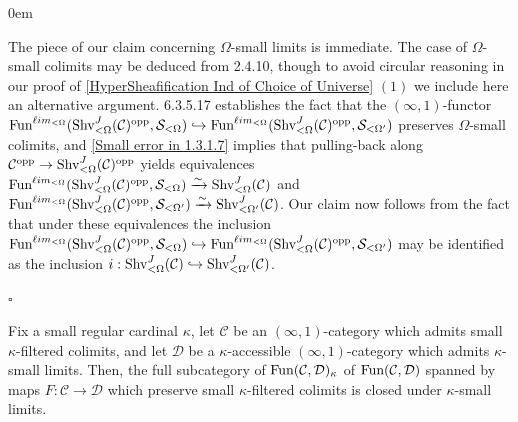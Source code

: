 \documentclass[10pt]{article}
\newcommand{\mS}{\mathcal S}
\newcommand{\C}{\mathcal C}
\newcommand{\cD}{\mathcal{D}}
\renewcommand{\qed}{\hfill$\square$}
\renewenvironment{proof}{\begin{addmargin}[1em]{0em}\begin{newproof}}{\end{newproof}\end{addmargin}\qed}
\theoremstyle{witharg}
\theoremstyle{witharg}
\theoremstyle{witharg2}
\begin{document}
\begin{proof}

    The piece of our claim concerning $\Omega$-small limits is immediate. The case of $\Omega$-small colimits may be deduced from  2.4.10, though to avoid circular reasoning in our proof of \ref{HyperSheafification Ind of Choice of Universe} $(1)$ we include here an alternative argument.  6.3.5.17 establishes the fact that the $(\infty,1)$-functor $\textnormal{Fun}^{\ell im_{<\Omega}}(\textnormal{Shv}^J_{<\Omega}(\C)^{\textnormal{opp}},\mS_{<\Omega})\hookrightarrow \textnormal{Fun}^{\ell im_{<\Omega}}(\textnormal{Shv}^J_{<\Omega}(\C)^{\textnormal{opp}},\mS_{<\Omega^\prime})$ preserves $\Omega$-small colimits, and \ref{Small error in 1.3.1.7} implies that pulling-back along $\C^{\textnormal{opp}}\rightarrow \textnormal{Shv}^J_{<\Omega}(\C)^{\textnormal{opp}}$ yields equivalences $\textnormal{Fun}^{\ell im_{<\Omega}}(\textnormal{Shv}^J_{<\Omega}(\C)^{\textnormal{opp}},\mS_{<\Omega})\xrightarrow{\sim}\textnormal{Shv}^J_{<\Omega}(\C)$ and $\textnormal{Fun}^{\ell im_{<\Omega}}(\textnormal{Shv}^J_{<\Omega}(\C)^{\textnormal{opp}},\mS_{<\Omega^\prime})\xrightarrow{\sim}\textnormal{Shv}^J_{<\Omega^\prime}(\C)$. Our claim now follows from the fact that under these equivalences the inclusion $\textnormal{Fun}^{\ell im_{<\Omega}}(\textnormal{Shv}^J_{<\Omega}(\C)^{\textnormal{opp}},\mS_{<\Omega})\hookrightarrow \textnormal{Fun}^{\ell im_{<\Omega}}(\textnormal{Shv}^J_{<\Omega}(\C)^{\textnormal{opp}},\mS_{<\Omega^\prime})$ may be identified as the inclusion $i:\textnormal{Shv}^J_{<\Omega}(\C)\hookrightarrow \textnormal{Shv}^J_{<\Omega^\prime}(\C)$.

\end{proof}

\begin{lemma}{}\label{kappa accessible functors}

    Fix a small regular cardinal $\kappa$, let $\C$ be an $(\infty,1)$-category which admits small $\kappa$-filtered colimits, and let $\cD$ be a $\kappa$-accessible $(\infty,1)$-category which admits $\kappa$-small limits. Then, the full subcategory of $\textnormal{Fun}(\C,\cD)_\kappa$ of $\textnormal{Fun}(\C,\cD)$ spanned by maps $F:\C\rightarrow \cD$ which preserve small $\kappa$-filtered colimits is closed under $\kappa$-small limits. 
    
\end{lemma}
\end{document}
